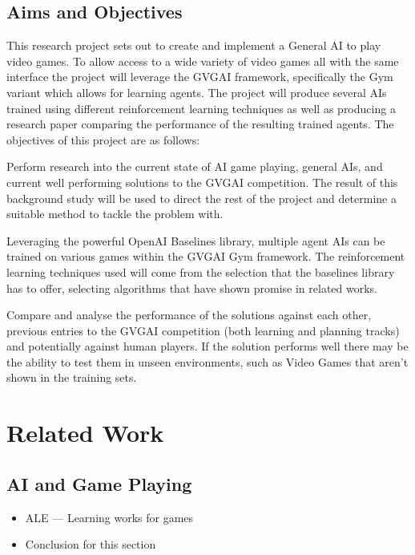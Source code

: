 \documentclass[a4paper]{article}
\begin{document}
\subsection{Aims and Objectives}
This research project sets out to create and implement a General AI to play video games.
To allow access to a wide variety of video games all with the same interface the project will leverage the GVGAI framework\cite{GVGAI2014}, specifically the Gym variant which allows for learning agents\cite{GVGAIGYM}.
The project will produce several AIs trained using different reinforcement learning techniques as well as producing a research paper comparing the performance of the resulting trained agents.
The objectives of this project are as follows:
\begin{description}
    \setlength{\parskip}{0pt}
    \item [Background Research]
    Perform research into the current state of AI game playing, general AIs, and current well performing solutions to the GVGAI competition.
    The result of this background study will be used to direct the rest of the project and determine a suitable method to tackle the problem with.

    \item [Train multiple General AIs]
    Leveraging the powerful OpenAI Baselines library\cite{baselines}, multiple agent AIs can be trained on various games within the GVGAI Gym framework.
    The reinforcement learning techniques used will come from the selection that the baselines library has to offer, selecting algorithms that have shown promise in related works.

    \item [Evaluation and Analysis of Solutions]
    Compare and analyse the performance of the solutions against each other, previous entries to the GVGAI competition (both learning and planning tracks) and potentially against human players.
    If the solution performs well there may be the ability to test them in unseen environments, such as Video Games that aren't shown in the training sets.
\end{description}

\section{Related Work}
\subsection{AI and Game Playing}
\begin{itemize}
    \item ALE --- Learning works for games
    \item Conclusion for this section
\end{itemize}
\end{document}
